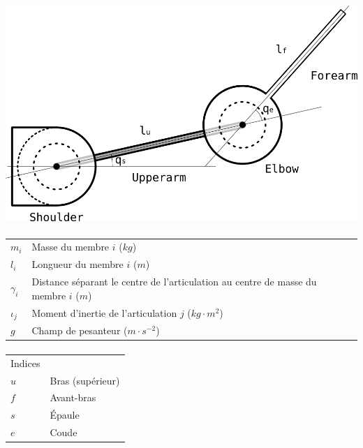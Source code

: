 \documentclass[pdftex,a4paper,11pt]{report}
\numberwithin{equation}{subsection}
\begin{document}
\begin{center}
        \includegraphics[width=.80\linewidth]{fig/arm}
\end{center}

\paragraph{}
\begin{tabular}{ll}
    $m_i$      & Masse du membre $i$ ($kg$) \\
    $l_i$      & Longueur du membre $i$ ($m$) \\
    $\gamma_i$ & Distance séparant le centre de l'articulation au centre de masse du membre $i$ ($m$) \\
    $\iota_j$  & Moment d'inertie de l'articulation $j$ ($kg \cdot m^2$) \\
    $g$        & Champ de pesanteur ($m \cdot s^{-2}$) \\
\end{tabular}

\paragraph{}
\begin{tabular}{ll}
    Indices & \\
    $u$ & Bras (supérieur)\\
    $f$ & Avant-bras\\
    $s$ & Épaule\\
    $e$ & Coude\\
\end{tabular}
\end{document}

